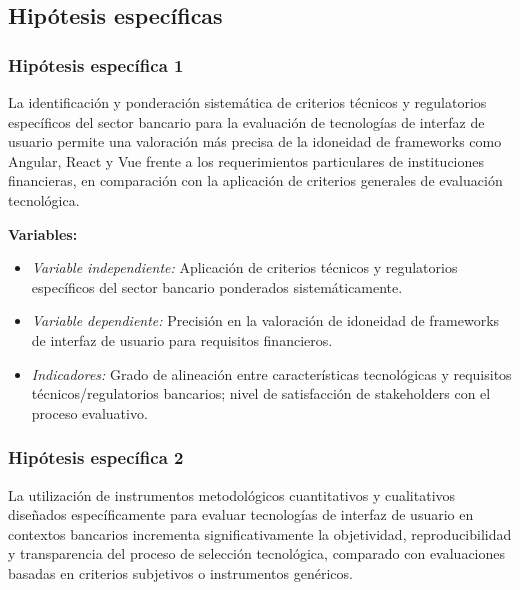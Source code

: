 \subsection{Hipótesis específicas}

\subsubsection{Hipótesis específica 1}

La identificación y ponderación sistemática de criterios técnicos y
        regulatorios específicos del sector bancario para la evaluación de
        tecnologías de interfaz de usuario permite una valoración más precisa
        de la idoneidad de frameworks como Angular, React y Vue frente a los
        requerimientos particulares de instituciones financieras, en
        comparación con la aplicación de criterios generales de evaluación
        tecnológica.

        \textbf{Variables:}
        \begin{itemize}
          \item \textit{Variable independiente:} Aplicación de criterios
                técnicos y regulatorios específicos del sector bancario
                ponderados sistemáticamente.
          \item \textit{Variable dependiente:} Precisión en la valoración de
                idoneidad de frameworks de interfaz de usuario para requisitos
                financieros.
          \item \textit{Indicadores:} Grado de alineación entre características
                tecnológicas y requisitos técnicos/regulatorios bancarios; nivel
                de satisfacción de stakeholders con el proceso evaluativo.
        \end{itemize}


\subsubsection{Hipótesis específica 2}

La utilización de instrumentos metodológicos cuantitativos y
        cualitativos diseñados específicamente para evaluar tecnologías de
        interfaz de usuario en contextos bancarios incrementa
        significativamente la objetividad, reproducibilidad y transparencia del
        proceso de selección tecnológica, comparado con evaluaciones basadas
        en criterios subjetivos o instrumentos genéricos.

